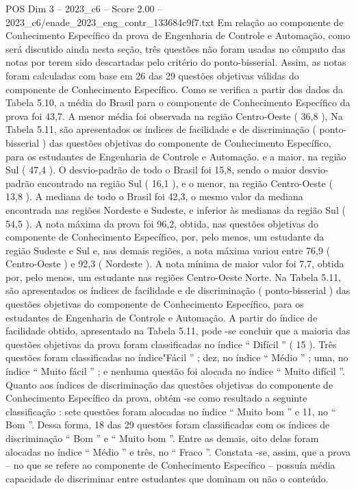 \begin{textsample}{POS Dim 3 – 2023\_c6 – Score 2.00 – 2023\_c6/enade\_2023\_eng\_contr\_133684c9f7.txt}
Em relação ao componente de Conhecimento Específico da prova de Engenharia de Controle e Automação, como será discutido ainda nesta seção, três questões não foram usadas no cômputo das notas por terem sido descartadas pelo critério do ponto-bisserial.
Assim, as notas foram calculadas com base em 26 das 29 questões objetivas válidas do componente de Conhecimento Específico.
Como se verifica a partir dos dados da Tabela 5.10, a média do Brasil para o componente de Conhecimento Específico da prova foi 43,7.
A menor média foi observada na região Centro-Oeste ( 36,8 ), Na Tabela 5.11, são apresentados os índices de facilidade e de discriminação ( ponto-bisserial ) das questões objetivas do componente de Conhecimento Específico, para os estudantes de Engenharia de Controle e Automação. e a maior, na região Sul ( 47,4 ).
O desvio-padrão de todo o Brasil foi 15,8, sendo o maior desvio-padrão encontrado na região Sul ( 16,1 ), e o menor, na região Centro-Oeste ( 13,8 ).
A mediana de todo o Brasil foi 42,3, o mesmo valor da mediana encontrada nas regiões Nordeste e Sudeste, e inferior às medianas da região Sul ( 54,5 ).
A nota máxima da prova foi 96,2, obtida, nas questões objetivas do componente de Conhecimento Específico, por, pelo menos, um estudante da região Sudeste e Sul e, nas demais regiões, a nota máxima variou entre 76,9 ( Centro-Oeste ) e 92,3 ( Nordeste ).
A nota mínima de maior valor foi 7,7, obtida por, pelo menos, um estudante nas regiões Centro-Oeste Norte.
Na Tabela 5.11, são apresentados os índices de facilidade e de discriminação ( ponto-bisserial ) das questões objetivas do componente de Conhecimento Específico, para os estudantes de Engenharia de Controle e Automação.
A partir do índice de facilidade obtido, apresentado na Tabela 5.11, pode -se concluir que a maioria das questões objetivas da prova foram classificadas no índice “ Difícil ” ( 15 ).
Três questões foram classificadas no índice"Fácil ” ; dez, no índice “ Médio ” ; uma, no índice “ Muito fácil ” ; e nenhuma questão foi alocada no índice “ Muito difícil ”.
Quanto aos índices de discriminação das questões objetivas do componente de Conhecimento Específico da prova, obtém -se como resultado a seguinte classificação : sete questões foram alocadas no índice “ Muito bom ” e 11, no “ Bom ”.
Dessa forma, 18 das 29 questões foram classificadas com os índices de discriminação “ Bom ” e “ Muito bom ”.
Entre as demais, oito delas foram alocadas no índice “ Médio ” e três, no “ Fraco ”.
Constata -se, assim, que a prova – no que se refere ao componente de Conhecimento Específico – possuía média capacidade de discriminar entre estudantes que dominam ou não o conteúdo.

\end{textsample}
